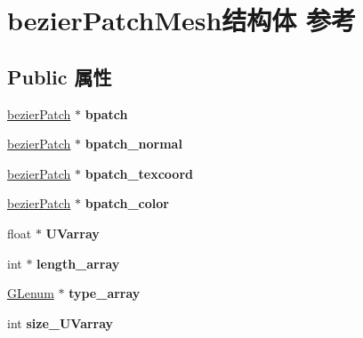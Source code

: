 \hypertarget{structbezier_patch_mesh}{}\section{bezier\+Patch\+Mesh结构体 参考}
\label{structbezier_patch_mesh}
\subsection*{Public 属性}
\begin{DoxyCompactItemize}
\item 
\mbox{\label{structbezier_patch_mesh_a3cbf33841e7ffadebaac2d16fb9894b8}} 
\hyperlink{structbezier_patch}{bezier\+Patch} $\ast$ {\bfseries bpatch}
\item 
\mbox{\label{structbezier_patch_mesh_ae1b75418d8f70c5bf68337fb6ff18ba8}} 
\hyperlink{structbezier_patch}{bezier\+Patch} $\ast$ {\bfseries bpatch\+\_\+normal}
\item 
\mbox{\label{structbezier_patch_mesh_a81875e8b3f8d7f97a574270ff1c91073}} 
\hyperlink{structbezier_patch}{bezier\+Patch} $\ast$ {\bfseries bpatch\+\_\+texcoord}
\item 
\mbox{\label{structbezier_patch_mesh_a66f40c54ade073baf3d07a11efbe5d12}} 
\hyperlink{structbezier_patch}{bezier\+Patch} $\ast$ {\bfseries bpatch\+\_\+color}
\item 
\mbox{\label{structbezier_patch_mesh_a7e8ead97931f2de032f71938a88c02f8}} 
float $\ast$ {\bfseries U\+Varray}
\item 
\mbox{\label{structbezier_patch_mesh_aff12f05267238439afbb296445a697b6}} 
int $\ast$ {\bfseries length\+\_\+array}
\item 
\mbox{\label{structbezier_patch_mesh_a8fdc113a658673234004ee93fcf8a411}} 
\hyperlink{interfacevoid}{G\+Lenum} $\ast$ {\bfseries type\+\_\+array}
\item 
\mbox{\label{structbezier_patch_mesh_aadebb6063439f042337a6190c0a83bfe}} 
int {\bfseries size\+\_\+\+U\+Varray}

\end{DoxyCompactItemize}
